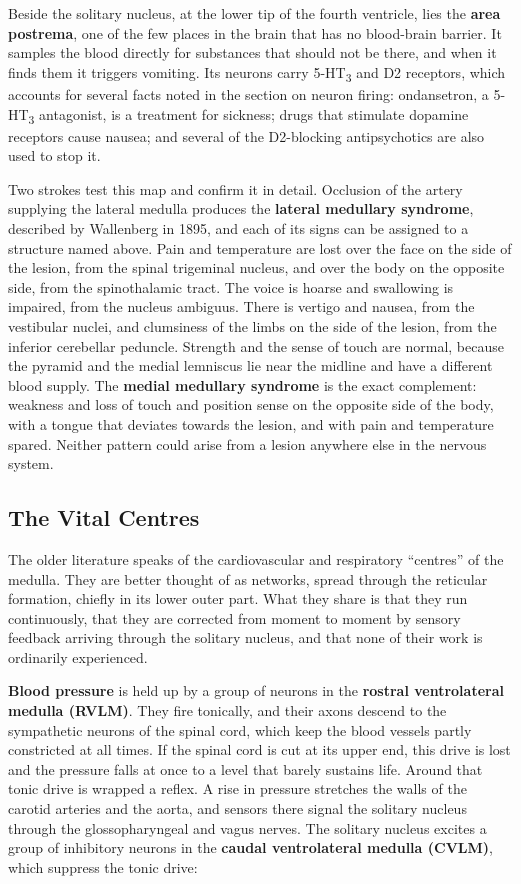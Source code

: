 \documentclass[11pt]{article}
\begin{document}
Beside the solitary nucleus, at the lower tip of the fourth ventricle, lies the \textbf{area postrema}, one of the few places in the brain that has no blood-brain barrier. It samples the blood directly for substances that should not be there, and when it finds them it triggers vomiting. Its neurons carry 5-HT\textsubscript{3} and D2 receptors, which accounts for several facts noted in the section on neuron firing: ondansetron, a 5-HT\textsubscript{3} antagonist, is a treatment for sickness; drugs that stimulate dopamine receptors cause nausea; and several of the D2-blocking antipsychotics are also used to stop it.

Two strokes test this map and confirm it in detail. Occlusion of the artery supplying the lateral medulla produces the \textbf{lateral medullary syndrome}, described by Wallenberg in 1895, and each of its signs can be assigned to a structure named above. Pain and temperature are lost over the face on the side of the lesion, from the spinal trigeminal nucleus, and over the body on the opposite side, from the spinothalamic tract. The voice is hoarse and swallowing is impaired, from the nucleus ambiguus. There is vertigo and nausea, from the vestibular nuclei, and clumsiness of the limbs on the side of the lesion, from the inferior cerebellar peduncle. Strength and the sense of touch are normal, because the pyramid and the medial lemniscus lie near the midline and have a different blood supply. The \textbf{medial medullary syndrome} is the exact complement: weakness and loss of touch and position sense on the opposite side of the body, with a tongue that deviates towards the lesion, and with pain and temperature spared. Neither pattern could arise from a lesion anywhere else in the nervous system.

\subsection{The Vital Centres}

The older literature speaks of the cardiovascular and respiratory ``centres'' of the medulla. They are better thought of as networks, spread through the reticular formation, chiefly in its lower outer part. What they share is that they run continuously, that they are corrected from moment to moment by sensory feedback arriving through the solitary nucleus, and that none of their work is ordinarily experienced.

\textbf{Blood pressure} is held up by a group of neurons in the \textbf{rostral ventrolateral medulla (RVLM)}. They fire tonically, and their axons descend to the sympathetic neurons of the spinal cord, which keep the blood vessels partly constricted at all times. If the spinal cord is cut at its upper end, this drive is lost and the pressure falls at once to a level that barely sustains life. Around that tonic drive is wrapped a reflex. A rise in pressure stretches the walls of the carotid arteries and the aorta, and sensors there signal the solitary nucleus through the glossopharyngeal and vagus nerves. The solitary nucleus excites a group of inhibitory neurons in the \textbf{caudal ventrolateral medulla (CVLM)}, which suppress the tonic drive:
\end{document}
